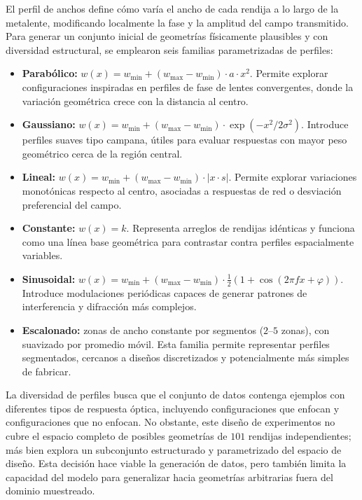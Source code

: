 El perfil de anchos define cómo varía el ancho de cada rendija a lo largo de la metalente, modificando localmente la fase y la amplitud del campo transmitido. Para generar un conjunto inicial de geometrías físicamente plausibles y con diversidad estructural, se emplearon seis familias parametrizadas de perfiles:

\begin{itemize}
\item \textbf{Parabólico:} $w(x) = w_{\min} + (w_{\max} - w_{\min}) \cdot a \cdot x^2$. Permite explorar configuraciones inspiradas en perfiles de fase de lentes convergentes, donde la variación geométrica crece con la distancia al centro.

\item \textbf{Gaussiano:} $w(x) = w_{\min} + (w_{\max} - w_{\min}) \cdot \exp\!\left(-x^2 / 2\sigma^2\right)$. Introduce perfiles suaves tipo campana, útiles para evaluar respuestas con mayor peso geométrico cerca de la región central.

\item \textbf{Lineal:} $w(x) = w_{\min} + (w_{\max} - w_{\min}) \cdot |x \cdot s|$. Permite explorar variaciones monotónicas respecto al centro, asociadas a respuestas de red o desviación preferencial del campo.

\item \textbf{Constante:} $w(x) = k$. Representa arreglos de rendijas idénticas y funciona como una línea base geométrica para contrastar contra perfiles espacialmente variables.

\item \textbf{Sinusoidal:} $w(x) = w_{\min} + (w_{\max} - w_{\min}) \cdot \tfrac{1}{2}(1 + \cos(2\pi f x + \varphi))$. Introduce modulaciones periódicas capaces de generar patrones de interferencia y difracción más complejos.

\item \textbf{Escalonado:} zonas de ancho constante por segmentos ($2$--$5$ zonas), con suavizado por promedio móvil. Esta familia permite representar perfiles segmentados, cercanos a diseños discretizados y potencialmente más simples de fabricar.

\end{itemize}

La diversidad de perfiles busca que el conjunto de datos contenga ejemplos con diferentes tipos de respuesta óptica, incluyendo configuraciones que enfocan y configuraciones que no enfocan. No obstante, este diseño de experimentos no cubre el espacio completo de posibles geometrías de $101$ rendijas independientes; más bien explora un subconjunto estructurado y parametrizado del espacio de diseño. Esta decisión hace viable la generación de datos, pero también limita la capacidad del modelo para generalizar hacia geometrías arbitrarias fuera del dominio muestreado.

